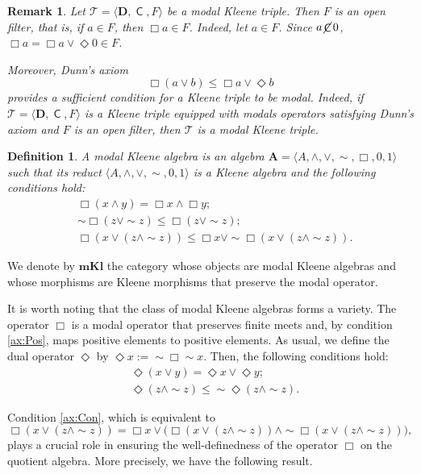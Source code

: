 \documentclass[10pt,a4paper]{amsart}
\newtheorem{remark}[theorem]{Remark}
\newtheorem{definition}[theorem]{Definition}
\DeclareMathOperator{\con}{\mathsf{C}}
\DeclareMathOperator{\notcon}{\cancel{ \con}}
\newcommand{\A}{\mathbf{A}}
\newcommand{\D}{\mathbf{D}}
\newcommand{\T}{\mathcal{T}}
\begin{document}
\begin{remark}\label{remark filter}
Let $\T=\langle \D,\con,F\rangle$ be a modal Kleene triple. Then $F$ is an open filter, that is, if $a\in F$, then $\Box a\in F$. Indeed, let $a\in F$. Since $a\notcon 0$, $\Box a=\Box a\vee\Diamond 0\in F$.

Moreover, Dunn's axiom
\[
\Box(a\vee b)\le \Box a\vee\Diamond b
\]
provides a sufficient condition for a Kleene triple to be modal. Indeed, if $\T=\langle \D,\con,F\rangle$ is a Kleene triple equipped with modals operators satisfying Dunn's axiom and $F$ is an open filter, then $\T$ is a modal Kleene triple.
\end{remark}

\begin{definition}
\label{def:modal-kleene}
A \emph{modal Kleene algebra} is an algebra $\A=\langle A,\wedge, \vee, \sim, \Box, 0,1\rangle$ such that its reduct $\langle A,\wedge, \vee, \sim, 0,1\rangle$ is a Kleene algebra and the following conditions hold:
    \begin{align}
        \label{mk}
        &\Box(x \wedge y) = \Box x \wedge \Box y;\tag{MK}\\
        \label{ax:Pos}
        &\sim\Box(z \vee \sim z)\leq \Box( z \vee \sim z);\tag{Pos}\\
        \label{ax:Con}
        &\Box(x \vee (z \wedge \sim z)) \leq \Box x\vee  \sim \Box(x \vee (z \wedge \sim z)).\tag{Con}
    \end{align}
\end{definition}

We denote by $\mathbf{mKl}$ the category whose objects are modal Kleene algebras and whose morphisms are Kleene morphisms that preserve the modal operator.

It is worth noting that the class of modal Kleene algebras forms a variety. The operator $\Box$ is a modal operator that preserves finite meets and, by condition \eqref{ax:Pos}, maps positive elements to positive elements. As usual, we define the dual operator $\Diamond$ by $\Diamond x := \sim \Box \sim x$. Then, the following conditions hold:
    \begin{align}
        \label{ax:MK'}
        &\Diamond(x \vee y) = \Diamond x \vee \Diamond y;\tag{MK'}\\
        \label{ax:Neg}
        &\Diamond(z \wedge \sim z)\leq \sim \Diamond(z \wedge \sim z).\tag{Neg}
    \end{align}

Condition \eqref{ax:Con}, which is equivalent to 
\begin{equation}
    \Box(x \vee (z \wedge \sim z))= \Box x\vee \big(\Box(x \vee (z \wedge \sim z))\wedge\sim \Box(x \vee (z \wedge \sim z))\big),\tag{Con'}\label{ax:Con'}
\end{equation} 
plays a crucial role in ensuring the well-definedness of the operator $\Box$ on the quotient algebra. More precisely, we have the following result.
\end{document}
